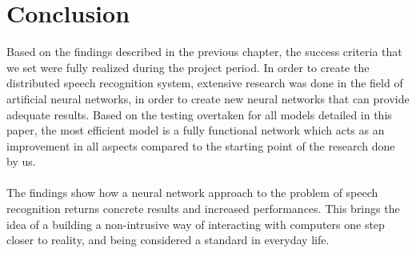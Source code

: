 \chapter{Conclusion}\label{ch:conclusion}
Based on the findings described in the previous chapter, 
the success criteria that we set were fully realized 
during the project period. In order to create the 
distributed speech recognition system, extensive research was done in the field of artificial neural networks, in 
order to create new neural networks that can provide 
adequate results. Based on the testing overtaken for all 
models detailed in this paper, the most efficient model 
is a fully functional network which acts as an 
improvement in all aspects compared to the starting 
point of the research done by us.\\\\
The findings show how a neural network approach to the 
problem of speech recognition returns concrete results 
and increased performances. This brings the idea of a 
building a non-intrusive way of interacting with 
computers one step closer to reality, and being 
considered a standard in everyday life.